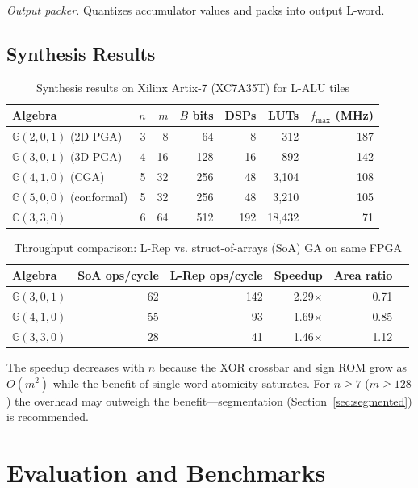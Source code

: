 \documentclass[11pt,a4paper]{article}
\theoremstyle{definition}
\theoremstyle{plain}
\theoremstyle{remark}
\newcommand{\GA}{\mathbb{G}}
\begin{document}
\textit{Output packer.}  Quantizes accumulator values and packs into output L-word.

\subsection{Synthesis Results}

\begin{table}[h]
\centering
\caption{Synthesis results on Xilinx Artix-7 (XC7A35T) for L-ALU tiles}
\label{tab:synth}
\begin{tabular}{lrrrrrr}
\toprule
Algebra & $n$ & $m$ & $B$ bits & DSPs & LUTs & $f_{\max}$ (MHz) \\
\midrule
$\GA(2,0,1)$ (2D PGA) & 3 & 8 & 64 & 8 & 312 & 187 \\
$\GA(3,0,1)$ (3D PGA) & 4 & 16 & 128 & 16 & 892 & 142 \\
$\GA(4,1,0)$ (CGA) & 5 & 32 & 256 & 48 & 3,104 & 108 \\
$\GA(5,0,0)$ (conformal) & 5 & 32 & 256 & 48 & 3,210 & 105 \\
$\GA(3,3,0)$ & 6 & 64 & 512 & 192 & 18,432 & 71 \\
\bottomrule
\end{tabular}
\end{table}

\begin{table}[h]
\centering
\caption{Throughput comparison: L-Rep vs. struct-of-arrays (SoA) GA on same FPGA}
\label{tab:throughput}
\begin{tabular}{lrrrrr}
\toprule
Algebra & SoA ops/cycle & L-Rep ops/cycle & Speedup & Area ratio \\
\midrule
$\GA(3,0,1)$ & 62 & 142 & 2.29$\times$ & 0.71 \\
$\GA(4,1,0)$ & 55 & 93 & 1.69$\times$ & 0.85 \\
$\GA(3,3,0)$ & 28 & 41 & 1.46$\times$ & 1.12 \\
\bottomrule
\end{tabular}
\end{table}

The speedup decreases with $n$ because the XOR crossbar and sign ROM grow as $O(m^2)$ while the benefit of single-word atomicity saturates.  For $n\ge 7$ ($m\ge 128$) the overhead may outweigh the benefit---segmentation (Section~\ref{sec:segmented}) is recommended.

\section{Evaluation and Benchmarks}
\label{sec:eval}
\end{document}
